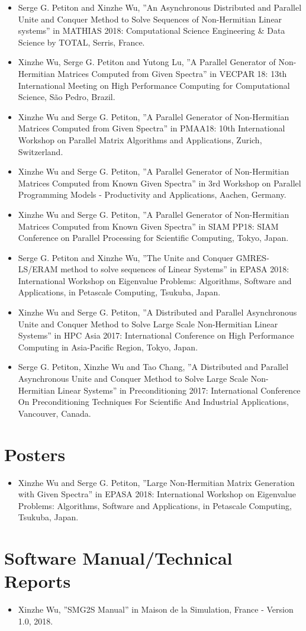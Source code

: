 \begin{itemize}
	\item Serge G. Petiton and Xinzhe Wu, ”An Asynchronous Distributed and Parallel Unite and Conquer Method to Solve Sequences of Non-Hermitian Linear systems” in MATHIAS 2018: Computational Science Engineering \& Data Science by TOTAL, Serris, France. 
	\item Xinzhe Wu, Serge G. Petiton and Yutong Lu, ”A Parallel Generator of Non-Hermitian Matrices Computed from Given Spectra” in VECPAR 18: 13th International Meeting on High Performance Computing for Computational Science, S\~ao Pedro, Brazil.
	\item Xinzhe Wu and Serge G. Petiton, ”A Parallel Generator of Non-Hermitian Matrices Computed from Given Spectra” in PMAA18: 10th International Workshop on Parallel Matrix Algorithms and Applications, Zurich, Switzerland.
	\item Xinzhe Wu and Serge G. Petiton, ”A Parallel Generator of Non-Hermitian Matrices Computed from Known Given Spectra” in 3rd Workshop on Parallel Programming Models - Productivity and Applications, Aachen, Germany.
	\item Xinzhe Wu and Serge G. Petiton, ”A Parallel Generator of Non-Hermitian Matrices Computed from Known Given Spectra” in SIAM PP18: SIAM Conference on Parallel Processing for Scientific Computing, Tokyo, Japan.
	\item  Serge G. Petiton and Xinzhe Wu, ”The Unite and Conquer GMRES-LS/ERAM method to solve sequences of Linear Systems” in EPASA 2018: International Workshop on Eigenvalue Problems: Algorithms, Software and Applications, in Petascale Computing, Tsukuba, Japan.
	\item Xinzhe Wu and Serge G. Petiton, ”A Distributed and Parallel Asynchronous Unite and Conquer Method to Solve Large Scale Non-Hermitian Linear Systems” in HPC Asia 2017: International Conference on High Performance Computing in Asia-Pacific Region, Tokyo, Japan.
	\item Serge G. Petiton, Xinzhe Wu and Tao Chang, ”A Distributed and Parallel Asynchronous Unite and Conquer Method to Solve Large Scale Non-Hermitian Linear Systems” in Preconditioning 2017: International Conference On Preconditioning Techniques For Scientific And Industrial Applications, Vancouver, Canada.
\end{itemize}

\section*{Posters}
\begin{itemize}
	\item Xinzhe Wu and Serge G. Petiton, ”Large Non-Hermitian Matrix Generation with Given Spectra” in EPASA 2018: International Workshop on Eigenvalue Problems: Algorithms, Software and Applications, in Petascale Computing, Tsukuba, Japan.
\end{itemize}

\section*{Software Manual/Technical Reports}
\begin{itemize}
	\item Xinzhe Wu, ”SMG2S Manual” in Maison de la Simulation, France - Version 1.0, 2018. 
\end{itemize}
\clearemptydoublepage